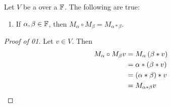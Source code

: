 \begin{prop}[\ScalingOperator]
    \label{prop:ScalingOperatorAlgebraicProperties}
    Let $V$
    be a 
    \VectorSpace
    over a 
    \Field
    $\mathbb{F}$. 
    The following are true:
    \begin{enumerate}
        \item If $\alpha, \beta \in \mathbb{F}$, then $M_\alpha \circ M_\beta = M_{\alpha * \beta}$. 
    \end{enumerate}


    \begin{proof}[Proof of 01]
        Let $v \in V$. Then 
        \begin{align*}
            M_{\alpha} \circ M_{\beta} v & = M_\alpha \left( \beta * v \right) \\
            & = \alpha * (\beta * v) \\
            & = (\alpha * \beta) * v \\
            & = M_{\alpha*\beta}v
        \end{align*}
    \end{proof} 

\end{prop}
